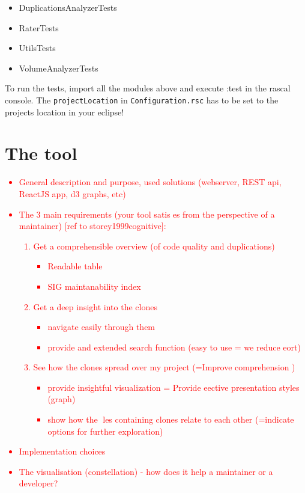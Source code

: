 \documentclass{uva-inf-article}
\newcommand\todo[1]{\textcolor{red}{#1}}
\begin{document}
\begin{itemize}

\item
  DuplicationsAnalyzerTests
\item
  RaterTests
\item
  UtilsTests
\item
  VolumeAnalyzerTests
\end{itemize}

To run the tests, import all the modules above and execute :test in the
rascal console. The \texttt{projectLocation} in
\texttt{Configuration.rsc} has to be set to the projects location in
your eclipse!


\section{The tool}
\todo{
\begin{itemize}
\item{General description and purpose, used solutions (webserver, REST api, ReactJS app, d3 graphs, etc)}
\item{The 3 main requirements (your tool satises from the perspective of a maintainer) [ref to storey1999cognitive]:
  \begin{enumerate}
    \item{Get a comprehensible overview (of code quality and duplications) 
      \begin{itemize}
        \item{Readable table}
        \item{SIG maintanability index}
      \end{itemize}
      }
    \item{Get a deep insight into the clones 
      \begin{itemize}
        \item{navigate easily through them}
        \item{provide and extended search function (easy to use = we reduce eort)}
      \end{itemize}
     }
    \item{See how the clones spread over my project (=Improve comprehension ) 
      \begin{itemize}
        \item{provide insightful visualization = Provide eective presentation styles (graph)}
        \item{show how the les containing clones relate to each other (=indicate options for further exploration)}
      \end{itemize}
      }
  \end{enumerate}
}
\item{Implementation choices}
\item{The visualisation (constellation) - how does it help a maintainer or a developer?}
\end{itemize}
}
\end{document}
